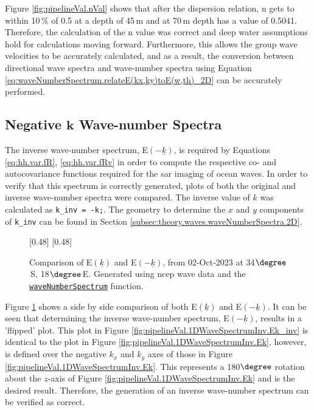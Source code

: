 Figure \ref{fig:pipelineVal.nVal} shows that after the dispersion relation, n gets to within 10\,\% of 0.5 at a depth of 45\,m and at 70\,m depth has a value of 0.5041. Therefore, the calculation of the n value was correct and deep water assumptions hold for calculations moving forward. Furthermore, this allows the group wave velocities to be accurately calculated, and as a result, the conversion between directional wave spectra and wave-number spectra using Equation \ref{eq:waveNumberSpectrum.relateE(kx,ky)toE(w,th)_2D} can be accurately performed.

\subsection{Negative $\mathbf{k}$ Wave-number Spectra} \label{subsec:pipelineVal.waveSpecta.invK}

The inverse wave-number spectrum, E$(-\underline{k})$, is required by Equations \ref{eq:hh.var.fR}, \ref{eq:hh.var.fRv} in order to compute the respective co- and autocovariance functions required for the \acs{sar} imaging of ocean waves. In order to verify that this spectrum is correctly generated, plots of both the original and inverse wave-number spectra were compared. The inverse value of $k$ was calculated as \lstinline{k_inv = -k;}. The geometry to determine the $x$ and $y$ components of \lstinline{k_inv} can be found in Section \ref{subsec:theory.waves.waveNumberSpectra.2D}.

\begin{figure}[H]
    \centering
    [0.48\linewidth]{
        \resizebox{\linewidth}{!}{}
    }
    [0.48\linewidth]{
        \resizebox{\linewidth}{!}{}
    }
    \caption{Comparison of E$(\underline{k})$ and E$(-\underline{k})$, from 02-Oct-2023 at 34$\degree$\,S, 18$\degree$\,E. Generated using \acs{ncep} wave data and the \href{https://github.com/JNSRYA006/sar-parameter-extraction-pipeline/blob/main/functions/waveSpectra/waveNumberSpectrum.m}{\lstinline{waveNumberSpectrum}} function.}
    \label{fig:pipelineVal.1DWaveSpectrumInv}
\end{figure}

Figure \ref{fig:pipelineVal.1DWaveSpectrumInv} shows a side by side comparison of both E$(\underline{k})$ and E$(-\underline{k})$. It can be seen that determining the inverse wave-number spectrum, E$(-\underline{k})$, results in a 'flipped' plot. This plot in Figure \ref{fig:pipelineVal.1DWaveSpectrumInv.Ek_inv} is identical to the plot in Figure \ref{fig:pipelineVal.1DWaveSpectrumInv.Ek}, however, is defined over the negative $k_x$ and $k_y$ axes of those in Figure \ref{fig:pipelineVal.1DWaveSpectrumInv.Ek}. This represents a 180$\degree$ rotation about the $z$-axis of Figure \ref{fig:pipelineVal.1DWaveSpectrumInv.Ek} and is the desired result. Therefore, the generation of an inverse wave-number spectrum can be verified as correct.


